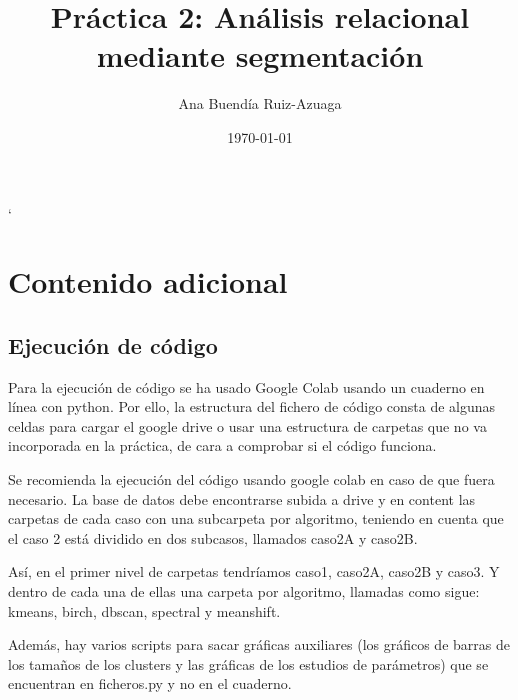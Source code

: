 \documentclass[twoside,openright,titlepage,numbers=noenddot,openany,headinclude,footinclude=true,
cleardoublepage=empty,abstractoff,BCOR=5mm,paper=a4,fontsize=12pt,main=spanish]{scrreprt}
\author{Ana Buendía Ruiz-Azuaga}
\date{\today}
\title{Práctica 2: Análisis relacional mediante segmentación}
\begin{document}
\maketitle
\tableofcontents

%


`




%


%


%




\chapter{Contenido adicional}
\section{Ejecución de código}
Para la ejecución de código se ha usado Google Colab usando un cuaderno en línea con python. Por ello, la estructura del fichero de código consta de algunas celdas para cargar el google drive o usar una estructura de carpetas que no va incorporada en la práctica, de cara a comprobar si el código funciona.

Se recomienda la ejecución del código usando google colab en caso de que fuera necesario. La base de datos debe encontrarse subida a drive y en content las carpetas de cada caso con una subcarpeta por algoritmo, teniendo en cuenta que el caso 2 está dividido en dos subcasos, llamados caso2A y caso2B.

Así, en el primer nivel de carpetas tendríamos caso1, caso2A, caso2B y caso3. Y dentro de cada una de ellas una carpeta por algoritmo, llamadas como sigue: kmeans, birch, dbscan, spectral y meanshift.

Además, hay varios scripts para sacar gráficas auxiliares (los gráficos de barras de los tamaños de los clusters y las gráficas de los estudios de parámetros) que se encuentran en ficheros.py y no en el cuaderno.
\end{document}
